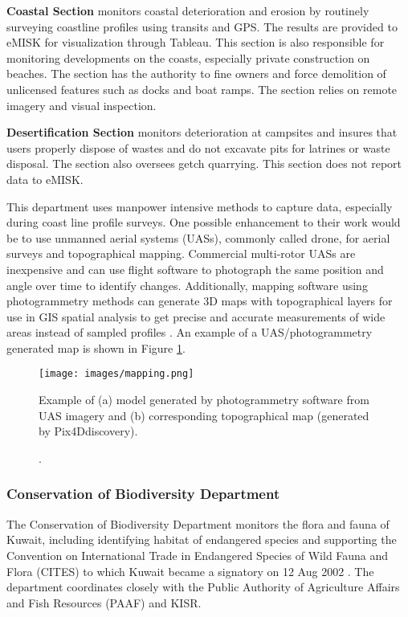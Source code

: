 \textbf{Coastal Section} monitors coastal deterioration and erosion by routinely surveying coastline profiles using transits and GPS. The results are provided to eMISK for visualization through Tableau. This section is also responsible for monitoring developments on the coasts, especially private construction on beaches. The section has the authority to fine owners and force demolition of unlicensed features such as docks and boat ramps. The section relies on remote imagery and visual inspection. 

\textbf{Desertification Section} monitors deterioration at campsites and insures that users properly dispose of wastes and do not excavate pits for latrines or waste disposal. The section also oversees getch quarrying. This section does not report data to eMISK.

This department uses manpower intensive methods to capture data, especially during coast line profile surveys. One possible enhancement to their work would be to use unmanned aerial systems (UASs), commonly called drone, for aerial surveys and topographical mapping. Commercial multi-rotor UASs are inexpensive and can use flight software to photograph the same position and angle over time to identify changes. Additionally, mapping software using photogrammetry methods can generate 3D maps with topographical layers for use in GIS spatial analysis to get precise and accurate measurements of wide areas instead of sampled profiles \citep{Coveney2017, Lizarazo2017}. An example of a UAS/photogrammetry generated map is shown in Figure \ref{fig:mapping}.

%
\begin{figure}[H]
\centering
\texttt{[image: images/mapping.png]} 
\caption[Examples of UAS generated model and map].{Example of (a) model generated by photogrammetry software from UAS imagery and (b) corresponding topographical map (generated by Pix4Ddiscovery).}
\label{fig:mapping}
\end{figure}
%

\subsubsection{Conservation of Biodiversity Department}

The Conservation of Biodiversity Department monitors the flora and fauna of Kuwait, including identifying habitat of endangered species and supporting the Convention on International Trade in Endangered Species of Wild Fauna and Flora (CITES) to which Kuwait became a signatory on 12 Aug 2002 \citep{cites2002}. The department coordinates closely with the Public Authority of Agriculture Affairs and Fish Resources (PAAF) and KISR.

